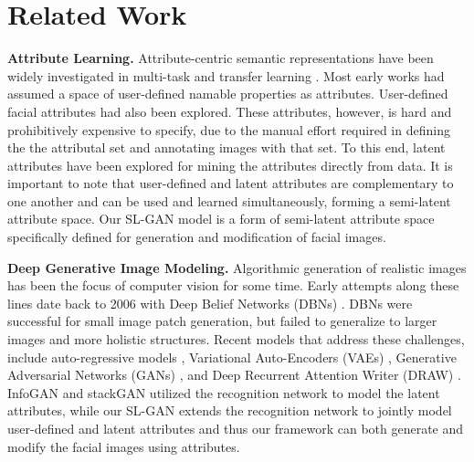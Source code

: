 \documentclass[10pt,letterpaper,twocolumn]{article}
\begin{document}
\section{Related Work}

\noindent \textbf{Attribute Learning.} Attribute-centric semantic
representations have been widely investigated in multi-task \cite{torralba2011app_share}
and transfer learning \cite{lampert13AwAPAMI}. Most early works \cite{lampert13AwAPAMI}
had assumed a space of user-defined namable properties as attributes.
User-defined facial attributes \cite{datta2011face_attrib,ehrlich2016facial,moon_attrb,wang2016walk,zhong2016face,kumar2009}
had also been explored. These attributes, however, is hard and prohibitively
expensive to specify, due to the manual effort required in defining
the the attributal set and annotating images with that set. To this
end, latent attributes \cite{yanweiPAMIlatentattrib} have been explored
for mining the attributes directly from data. It is important to note
that user-defined and latent attributes are complementary to one another
and can be used and learned simultaneously, forming a semi-latent
attribute space. Our SL-GAN model is a form of semi-latent attribute
space specifically defined for generation and modification of facial
images.

\vspace{0.07in}

\noindent \textbf{Deep Generative Image Modeling.} Algorithmic generation of
realistic images has been the focus of computer vision for some time.
Early attempts along these lines date back to 2006 with Deep Belief
Networks (DBNs) \cite{hinton2006science}. DBNs were successful for
small image patch generation, but failed to generalize to larger images
and more holistic structures. Recent models that address these challenges,
include auto-regressive models \cite{gregor2014icml,theis2015nips,oord2016nips},
Variational Auto-Encoders (VAEs) \cite{vaegan,cvae2016nips,yan2016eccv},
Generative Adversarial Networks (GANs) \cite{infogan,Denton2015nips,alexey2015cvpr,ishan2017iclr,gan2014,xun2017cvpr,kulkarni2015nips,anh2016play,scott2016nips,reed2016generative,reed2014icml},
and Deep Recurrent Attention Writer (DRAW) \cite{karol2015icml}.
InfoGAN \cite{infogan} and stackGAN \cite{xun2017cvpr} utilized
the recognition network to model the latent attributes, while our
SL-GAN extends the recognition network to jointly model user-defined
and latent attributes and thus our framework can both generate and
modify the facial images using attributes.
\end{document}
